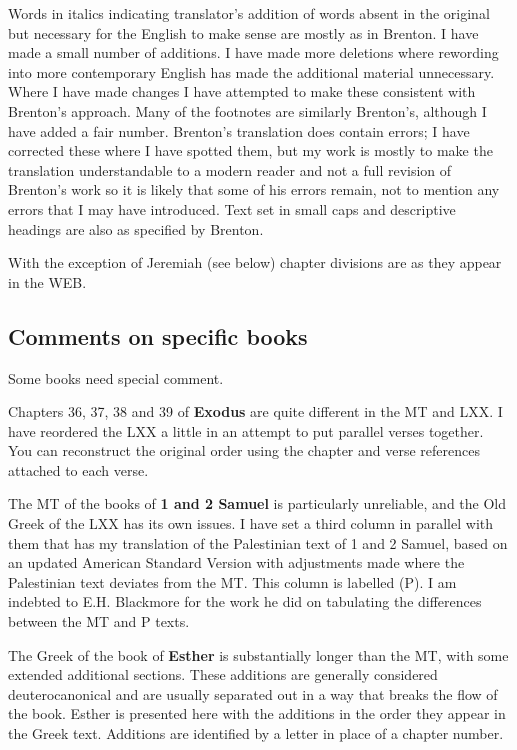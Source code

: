 {{Words in italics indicating translator's addition of words absent in the original but necessary for the English to make sense are mostly as in Brenton. I have made a small number of additions. I have made more deletions where rewording into more contemporary English has made the additional material unnecessary. Where I have made changes I have attempted to make these consistent with Brenton's approach. Many of the footnotes are similarly Brenton's, although I have added a fair number. Brenton's translation does contain errors; I have corrected these where I have spotted them, but my work is mostly to make the translation understandable to a modern reader and not a full revision of Brenton's work so it is likely that some of his errors remain, not to mention any errors that I may have introduced. Text set in small caps and descriptive headings are also as specified by Brenton.

With the exception of Jeremiah (see below) chapter divisions are as they appear in the WEB.

\subsection*{Comments on specific books}
Some books need special comment.

Chapters 36, 37, 38 and 39 of \textbf{Exodus} are quite different in the MT and LXX. I have reordered the LXX a little in an attempt to put parallel verses together. You can reconstruct the original order using the chapter and verse references attached to each verse.

The MT of the books of \textbf{1 and 2 Samuel} is particularly unreliable, and the Old Greek of the LXX has its own issues. I have set a third column in parallel with them that has my translation of the Palestinian text of 1 and 2 Samuel, based on an updated American Standard Version with adjustments made where the Palestinian text deviates from the MT. This column is labelled (P). I am indebted to E.H. Blackmore for the work he did on tabulating the differences between the MT and P texts.

The Greek of the book of \textbf{Esther} is substantially longer than the MT, with some extended additional sections. These additions are generally considered deuterocanonical and are usually separated out in a way that breaks the flow of the book. Esther is presented here with the additions in the order they appear in the Greek text. Additions are identified by a letter in place of a chapter number.

}}
